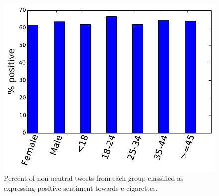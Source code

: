 \documentclass{sig-alternate}
\begin{document}
\begin{figure}[t]
\includegraphics[width=\columnwidth]{nb/pct_pos.pdf}  %
\caption{Percent of non-neutral tweets from each group classified as expressing positive sentiment towards e-cigarettes.\label{f.pct_pos}}
\centering
\end{figure}
\end{document}
